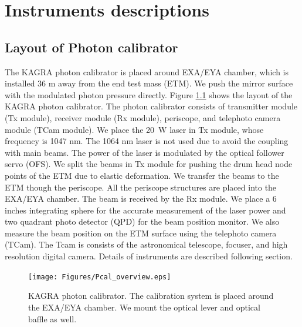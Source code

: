 
\chapter{Instruments descriptions} %

\label{Chapter3} %




\section{Layout of Photon calibrator}
The KAGRA photon calibrator is placed around EXA/EYA chamber, which is installed 36 m away from the end test mass (ETM). We push the mirror surface with the modulated photon pressure directly. Figure \ref{fig:Pcal_overview} shows the layout of the KAGRA photon calibrator. The photon calibrator consists of transmitter module (Tx module), receiver module (Rx module), periscope, and telephoto camera module (TCam module). We place the 20~W laser in Tx module, whose frequency is 1047 nm. The 1064 nm laser is not used due to avoid the coupling with main beams.   The power of the laser is modulated by the optical follower servo (OFS). We split the beams in Tx module for pushing the drum head node points of the ETM due to elastic deformation. We transfer the beams to the ETM though the periscope. All the periscope structures are placed into the EXA/EYA chamber. The beam is received by the Rx module. We place a 6 inches integrating sphere for the accurate measurement of the laser power and two quadrant photo detector (QPD) for the beam position monitor. We also measure the beam position on the ETM surface using the telephoto camera (TCam). The Tcam is consists of the astronomical telescope, focuser, and high resolution digital camera.  Details of instruments are described following section.
\begin{figure}
\begin{center}
\texttt{[image: Figures/Pcal\_overview.eps]}
\caption{KAGRA photon calibrator. The calibration system is placed around the EXA/EYA chamber. We mount the optical lever and optical baffle as well.} 
\label{fig:Pcal_overview} 
\end{center}
\end{figure}


